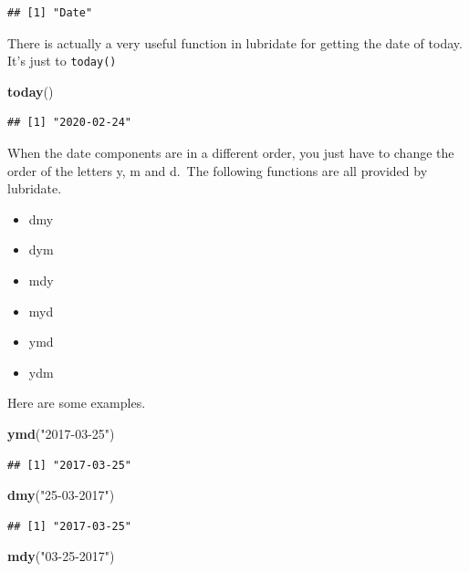 \documentclass[]{tufte-book}
\newenvironment{Shaded}{}{}
\newcommand{\KeywordTok}[1]{\textcolor[rgb]{0.00,0.44,0.13}{\textbf{#1}}}
\newcommand{\NormalTok}[1]{#1}
\newcommand{\StringTok}[1]{\textcolor[rgb]{0.25,0.44,0.63}{#1}}
\providecommand{\tightlist}{%
  \setlength{\itemsep}{0pt}\setlength{\parskip}{0pt}}
\begin{document}
\begin{verbatim}
## [1] "Date"
\end{verbatim}

There is actually a very useful function in lubridate for getting the date of today. It's just to \texttt{today()}

\begin{Shaded}
\begin{Highlighting}[]
\KeywordTok{today}\NormalTok{()}
\end{Highlighting}
\end{Shaded}

\begin{verbatim}
## [1] "2020-02-24"
\end{verbatim}

When the date components are in a different order, you just have to change the order of the letters y, m and d.~The following functions are all provided by lubridate.

\begin{itemize}
\tightlist
\item
  dmy
\item
  dym
\item
  mdy
\item
  myd
\item
  ymd
\item
  ydm
\end{itemize}

Here are some examples.

\begin{Shaded}
\begin{Highlighting}[]
\KeywordTok{ymd}\NormalTok{(}\StringTok{"2017-03-25"}\NormalTok{)}
\end{Highlighting}
\end{Shaded}

\begin{verbatim}
## [1] "2017-03-25"
\end{verbatim}

\begin{Shaded}
\begin{Highlighting}[]
\KeywordTok{dmy}\NormalTok{(}\StringTok{"25-03-2017"}\NormalTok{)}
\end{Highlighting}
\end{Shaded}

\begin{verbatim}
## [1] "2017-03-25"
\end{verbatim}

\begin{Shaded}
\begin{Highlighting}[]
\KeywordTok{mdy}\NormalTok{(}\StringTok{"03-25-2017"}\NormalTok{)}
\end{Highlighting}
\end{Shaded}
\end{document}
